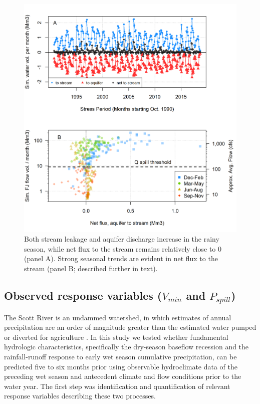 \documentclass[hess, manuscript]{copernicus}
\begin{document}
\begin{figure}
\includegraphics[width=1\linewidth]{f03} \caption{\label{fig:flow_to_aq_and_stream} Both stream leakage and aquifer discharge increase in the rainy season, while net flux to the stream remains relatively close to 0 (panel A). Strong seasonal trends are evident in net flux to the stream (panel B; described further in text).}\label{fig:flow_to_aq_and_stream}
\end{figure}

\subsection{\texorpdfstring{Observed response variables (\(V_{min}\) and
\(P_{spill}\))}{Observed response variables (V\_\{min\} and P\_\{spill\})}}

The Scott River is an undammed watershed, in which estimates of annual
precipitation are an order of magnitude greater than the estimated water
pumped or diverted for agriculture \citep{Tolley2019}. In this study we
tested whether fundamental hydrologic characteristics, specifically the
dry-season baseflow recession and the rainfall-runoff response to early
wet season cumulative precipitation, can be predicted five to six months
prior using observable hydroclimate data of the preceding wet season and
antecedent climate and flow conditions prior to the water year. The
first step was identification and quantification of relevant response
variables describing these two processes.
\end{document}
